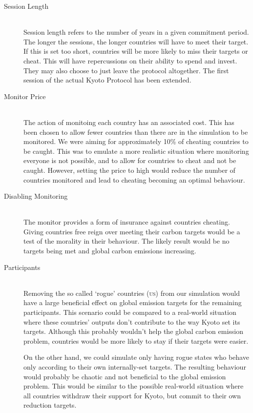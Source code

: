 \begin{description}
\item[Session Length] \hfill \\

Session length refers to the number of years in a given commitment period. The longer the sessions, the longer countries will have to meet their target. If this is set too short, countries will be more likely to miss their targets or cheat. This will have repercussions on their ability to spend and invest. They may also choose to just leave the protocol altogether.  The first session of the actual Kyoto Protocol has been extended.

\item[Monitor Price] \hfill \\

The action of monitoing each country has an associated cost. This has been chosen to allow fewer countries than there are in the simulation to be monitored. We were aiming for approximately 10\% of cheating countries to be caught. This was to emulate a more realistic situation where monitoring everyone is not possible, and to allow for countries to cheat and not be caught. However, setting the price to high would reduce the number of countries monitored and lead to cheating becoming an optimal behaviour.

\item[Disabling Monitoring] \hfill \\

The monitor provides a form of insurance against countries cheating. Giving countries free reign over meeting their carbon targets would be a test of the morality in their behaviour. The likely result would be no targets being met and global carbon emissions increasing.

\item[Participants] \hfill \\

Removing the so called `rogue' countries (\textsc{us}) from our simulation would have a large beneficial effect on global emission targets for the remaining participants. This scenario could be compared to a real-world situation where these countries' outputs don't contribute to the way Kyoto set its targets. Although this probably wouldn't help the global carbon emission problem, countries would be more likely to stay if their targets were easier.

On the other hand, we could simulate only having rogue states who behave only according to their own internally-set targets. The resulting behaviour would probably be chaotic and not beneficial to the global emission problem. This would be similar to the possible real-world situation where all countries withdraw their support for Kyoto, but commit to their own reduction targets.


\end{description}
